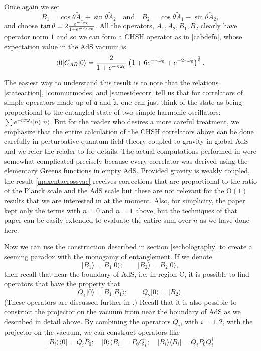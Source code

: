 \documentclass[12pt]{article}
\def\Or[#1]{{\text{O}}\left({#1}\right)}
\newcommand{\be}{\begin{equation}}
\newcommand{\ee}{\end{equation}}
\def \anh {\mathfrak{a}}
\def \tildanh {\widetilde{\mathfrak{a}}}
\def\projvac{{\cal P}_{\Omega}}
\def\projvac{P_0}
\begin{document}
Once again we set
\be
B_1 = \cos \theta \widetilde{A}_1 + \sin \theta \widetilde{A}_2  \quad \text{and}  \quad B_2 = \cos \theta \widetilde{A}_1 - \sin \theta \widetilde{A}_2,
\ee
and choose $\tan \theta = 2 {e^{-{\pi \omega_0}} \over 1 + e^{-{2 \pi \omega_0}}}$. All the operators, $A_1, A_2, B_1, B_2$ clearly have operator norm $1$ and so we can form a CHSH operator as in \eqref{cabdefn}, whose expectation value in the AdS vacuum is
\be
\label{maxentacrossvac}
\langle 0 | C_{AB} | 0  \rangle = {2 \over 1 + e^{-\pi \omega_0}} \left(1 + 6 e^{-{\pi \omega_0}} + e^{-2 \pi \omega_0} \right)^{1 \over 2}.
\ee

The easiest way to understand this result is to note that the relations \eqref{stateaction}, \eqref{commutmodes} and \eqref{samesidecorr} tell us that for correlators of simple operators made up of $\anh$ and $\tildanh$, one can just think of the state as being proportional to the  entangled state of two simple harmonic oscillators: $ \sum e^{-n \pi \omega_0} |n \rangle |\widetilde{n} \rangle$. But for the reader who desires a more careful treatment, we emphasize that the entire calculation of the CHSH correlators above can be done carefully in perturbative quantum field theory coupled to gravity in global AdS and we refer the reader to \cite{Raju:2018zpn} for details. The actual computations performed in \cite{Raju:2018zpn} were somewhat complicated precisely because every correlator was derived using the elementary Greens functions in empty AdS.  Provided gravity is weakly coupled, the result \eqref{maxentacrossvac} receives corrections that are proportional to the ratio of the Planck scale and the AdS scale but these are not relevant for the $\Or[1]$ results that we are interested in at the moment. Also, for simplicity, the paper \cite{Raju:2018zpn} kept only the terms with $n=0$ and $n=1$ above, but the techniques of that paper can be easily extended to evaluate the entire sum over $n$ as we have done here.


Now we can use the construction described in section \ref{secholography} to create a seeming paradox with the monogamy of entanglement. If we denote
\be
|B_1 \rangle = B_1 |0 \rangle; \qquad |B_2 \rangle = B_2 | 0 \rangle,
\ee
then recall that near the boundary of AdS, i.e. in region C, it is possible to find operators that have the property that
\be
Q_1 | 0 \rangle = B_1 |B_1 \rangle; \qquad Q_2 | 0 \rangle = |B_2 \rangle.
\ee
(These operators are discussed further in \cite{Raju:2018zpn}.)
Recall that it is also possible to construct the projector on the vacuum from near the boundary of AdS as we described in detail above. By combining the operators $Q_i$, with $i=1,2$, with the projector on the vacuum, we can construct operators like
\be
|B_i \rangle \langle 0| = Q_i \projvac; \quad |0 \rangle \langle B_i| = \projvac Q_i^{\dagger}; \quad |B_i \rangle \langle B_i | = Q_i \projvac Q_i^{\dagger}
\ee
\end{document}
